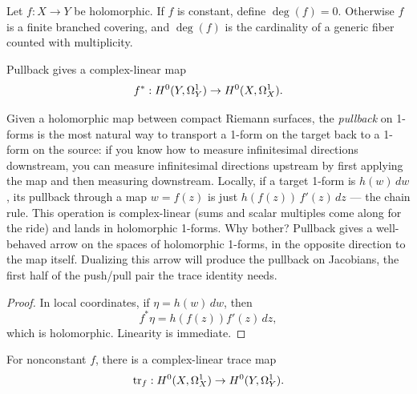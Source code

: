 Let \(f:X\to Y\) be holomorphic. If \(f\) is constant, define
\(\deg(f)=0\). Otherwise \(f\) is a finite branched covering, and
\(\deg(f)\) is the cardinality of a generic fiber counted with multiplicity.

\begin{lemma}
\label{lem:pullback-forms}

Pullback gives a complex-linear map
\[
  f^{*}:H^{0}(Y,\Omega^{1}_{Y})\to H^{0}(X,\Omega^{1}_{X}).
\]
\leanok
\end{lemma}

\begin{layman}
Given a holomorphic map between compact Riemann surfaces, the
\emph{pullback} on 1-forms is the most natural way to transport a
1-form on the target back to a 1-form on the source: if you know how
to measure infinitesimal directions downstream, you can measure
infinitesimal directions upstream by first applying the map and then
measuring downstream. Locally, if a target 1-form is \(h(w)\,dw\), its
pullback through a map \(w = f(z)\) is just \(h(f(z))\,f'(z)\,dz\) ---
the chain rule. This operation is complex-linear (sums and scalar
multiples come along for the ride) and lands in holomorphic
1-forms. Why bother? Pullback gives a well-behaved arrow on the spaces
of holomorphic 1-forms, in the opposite direction to the map itself.
Dualizing this arrow will produce the pullback on Jacobians, the first
half of the push/pull pair the trace identity needs.
\end{layman}

\begin{proof}
\leanok
In local coordinates, if \(\eta=h(w)\,dw\), then
\[
  f^{*}\eta = h(f(z))f'(z)\,dz,
\]
which is holomorphic. Linearity is immediate.
\end{proof}
\begin{lemma}
\label{lem:trace-forms}

For nonconstant \(f\), there is a complex-linear trace map
\[
  \operatorname{tr}_f:H^{0}(X,\Omega^{1}_{X})\to H^{0}(Y,\Omega^{1}_{Y}).
\]
\leanok
\end{lemma}



